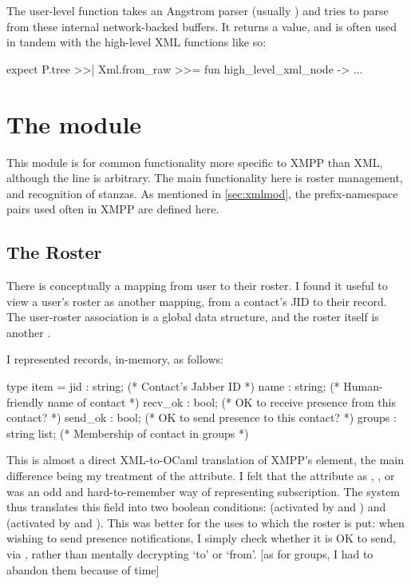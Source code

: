 \documentclass[12pt,a4paper,twoside,openright]{report}
\begin{document}
{The user-level  function takes an Angstrom parser (usually ) and tries to parse from these internal network-backed buffers. It returns a  value, and is often used in tandem with the high-level XML functions like so:

\begin{ocaml}
expect P.tree >>| Xml.from_raw >>= fun high_level_xml_node -> ...
\end{ocaml}

\section{The  module}
This module is for common functionality more specific to XMPP than XML, although the line is arbitrary. The main functionality here is roster management, and recognition of stanzas. As mentioned in \ref{sec:xmlmod}, the prefix-namespace pairs used often in XMPP are defined here.

\subsection{The Roster}
There is conceptually a mapping from user to their roster. I found it useful to view a user's roster as another mapping, from a contact's JID to their  record. The user-roster association is a global  data structure, and the roster itself is another .

I represented  records, in-memory, as follows:

\begin{minipage}{\linewidth}
  \begin{ocaml}
    type item = {
      jid     : string;        (* Contact's Jabber ID                       *)
      name    : string;        (* Human-friendly name of contact            *)
      recv_ok : bool;          (* OK to receive presence from this contact? *)
      send_ok : bool;          (* OK to send presence to this contact?      *)
      groups  : string list; (* Membership of contact in groups           *)
    }
  \end{ocaml}
\end{minipage}

This is almost a direct XML-to-OCaml translation of XMPP's  element, the main difference being my treatment of the  attribute. I felt that the  attribute as , ,  or  was an odd and hard-to-remember way of representing subscription. The system thus translates this field into two boolean conditions:  (activated by  and ) and  (activated by  and ). This was better for the uses to which the roster is put: when wishing to send presence notifications, I simply check whether it is OK to send, via , rather than mentally decrypting `to' or `from'. [as for groups, I had to abandon them because of time]

}
\end{document}

